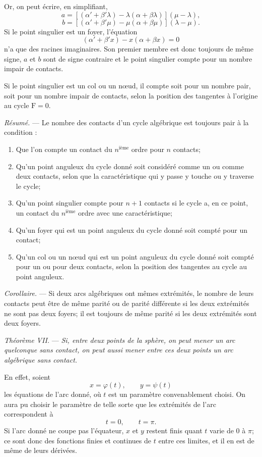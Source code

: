 \documentclass[11pt]{article}
\begin{document}
Or, on peut écrire, en simplifiant,
\[
a=[(\alpha'+\beta'\lambda)-\lambda(\alpha+\beta\lambda)](\mu-\lambda),
\]
\[
b=[(\alpha'+\beta'\mu)-\mu(\alpha+\beta\mu)](\lambda-\mu).
\]
Si le point singulier est un foyer, l’équation
\[
(\alpha'+\beta'x)-x(\alpha+\beta x)=0
\]
n’a que des racines imaginaires. Son premier membre est donc toujours de même signe, $a$ et $b$ sont de signe contraire et le point singulier compte pour un nombre impair de contacts.

Si le point singulier est un col ou un nœud, il compte soit pour un nombre pair, soit pour un nombre impair de contacts, selon la position des tangentes à l’origine au cycle $\mathrm F=0$.

\emph{Résumé.} --- Le nombre des contacts d’un cycle algébrique est toujours pair à la condition :

\begin{enumerate}[label=\arabic*°]
\item Que l’on compte un contact du $n^{\text{ième}}$ ordre pour $n$ contacts;
\item Qu’un point anguleux du cycle donné soit considéré comme un ou comme deux contacts, selon que la caractéristique qui y passe y touche ou y traverse le cycle;
\item Qu’un point singulier compte pour $n+1$ contacts si le cycle a, en ce point, un contact du $n^{\text{ième}}$ ordre avec une caractéristique;
\item Qu’un foyer qui est un point anguleux du cycle donné soit compté pour un contact;
\item Qu’un col ou un nœud qui est un point anguleux du cycle donné soit compté pour un ou pour deux contacts, selon la position des tangentes au cycle au point anguleux.
\end{enumerate}

\emph{Corollaire.} --- Si deux arcs algébriques ont mêmes extrémités, le nombre de leurs contacts peut être de même parité ou de parité différente si les deux extrémités ne sont pas deux foyers; il est toujours de même parité si les deux extrémités sont deux foyers.

\emph{Théorème VII.} --- \emph{Si, entre deux points de la sphère, on peut mener un arc quelconque sans contact, on peut aussi mener entre ces deux points un arc algébrique sans contact.}

En effet, soient
\[
x=\varphi(t),\qquad y=\psi(t)
\]
les équations de l’arc donné, où $t$ est un paramètre convenablement choisi. On aura pu choisir le paramètre de telle sorte que les extrémités de l’arc correspondent à
\[
t=0,
\qquad
t=\pi.
\]
Si l’arc donné ne coupe pas l’équateur, $x$ et $y$ restent finis quant $t$ varie de $0$ à $\pi$; ce sont donc des fonctions finies et continues de $t$ entre ces limites, et il en est de même de leurs dérivées.
\end{document}
